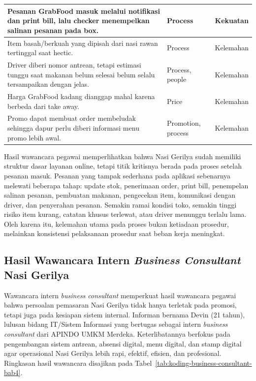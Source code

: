 \begin{xltabular}{\textwidth}{|Y|Z{2.85cm}|Z{2.65cm}|}
        Pesanan GrabFood masuk melalui notifikasi dan print bill, lalu checker menempelkan salinan pesanan pada box. & Process & Kekuatan \\ \hline
        Item basah/berkuah yang dipisah dari nasi rawan tertinggal saat hectic. & Process & Kelemahan \\ \hline
        Driver diberi nomor antrean, tetapi estimasi tunggu saat makanan belum selesai belum selalu tersampaikan dengan jelas. & Process, people & Kelemahan \\ \hline
        Harga GrabFood kadang dianggap mahal karena berbeda dari take away. & Price & Kelemahan \\ \hline
        Promo dapat membuat order membeludak sehingga dapur perlu diberi informasi menu promo lebih awal. & Promotion, process & Kelemahan \\ \hline
    \end{xltabular}
\endgroup

Hasil wawancara pegawai memperlihatkan bahwa Nasi Gerilya sudah memiliki struktur dasar layanan online, tetapi titik kritisnya berada pada proses setelah pesanan masuk. Pesanan yang tampak sederhana pada aplikasi sebenarnya melewati beberapa tahap: update stok, penerimaan order, print bill, penempelan salinan pesanan, pembuatan makanan, pengecekan item, komunikasi dengan driver, dan penyerahan pesanan. Semakin ramai kondisi toko, semakin tinggi risiko item kurang, catatan khusus terlewat, atau driver menunggu terlalu lama. Oleh karena itu, kelemahan utama pada proses bukan ketiadaan prosedur, melainkan konsistensi pelaksanaan prosedur saat beban kerja meningkat.

\subsection{Hasil Wawancara Intern \textit{Business Consultant} Nasi Gerilya}
Wawancara intern \textit{business consultant} memperkuat hasil wawancara pegawai bahwa persoalan pemasaran Nasi Gerilya tidak hanya terletak pada promosi, tetapi juga pada kesiapan sistem internal. Informan bernama Devin (21 tahun), lulusan bidang IT/Sistem Informasi yang bertugas sebagai intern \textit{business consultant} dari APINDO UMKM Merdeka. Keterlibatannya berfokus pada pengembangan sistem antrean, absensi digital, menu digital, dan stamp digital agar operasional Nasi Gerilya lebih rapi, efektif, efisien, dan profesional. Ringkasan hasil wawancara disajikan pada Tabel~\ref{tab:koding-business-consultant-bab4}.

